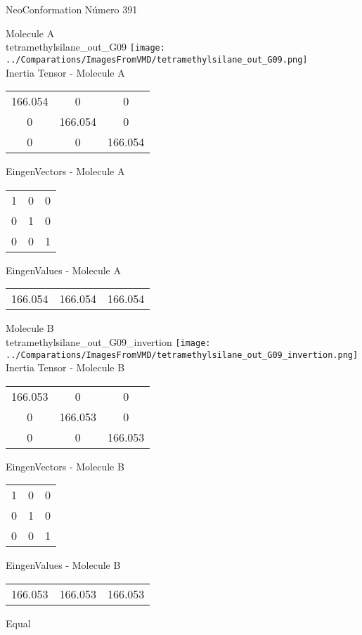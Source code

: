 \vtab[-2cm]
\begin{center}
{\large NeoConformation \tab Número 391}
\end{center}
\begin{multicols}{2}
\begin{center}

Molecule A \\ 
tetramethylsilane\_out\_G09
\texttt{[image: ../Comparations/ImagesFromVMD/tetramethylsilane\_out\_G09.png]}
\\
Inertia Tensor - Molecule A \\
\vtab

\begin{tabular}{|c c c|}
166.054	 & 	0	 & 	0	 \\
0	 & 	166.054	 & 	0	 \\
0	 & 	0	 & 	166.054
\end{tabular}

\vtab
 EingenVectors - Molecule A     \\
\vtab
\begin{tabular}{|c c c|}
1	 & 	0	 & 	0	 \\
0	 & 	1	 & 	0	 \\
0	 & 	0	 & 	1
\end{tabular}

\vtab
 EingenValues - Molecule A     \\
\vtab
\begin{tabular}{|c c c|}
166.054	 & 	166.054	 & 	166.054	 \\
\end{tabular}
\columnbreak

Molecule B \\ 
tetramethylsilane\_out\_G09\_invertion
\texttt{[image: ../Comparations/ImagesFromVMD/tetramethylsilane\_out\_G09\_invertion.png]}
\\
Inertia Tensor - Molecule B \\
\vtab

\begin{tabular}{|c c c|}
166.053	 & 	0	 & 	0	 \\
0	 & 	166.053	 & 	0	 \\
0	 & 	0	 & 	166.053
\end{tabular}

\vtab
 EingenVectors - Molecule B     \\
\vtab
\begin{tabular}{|c c c|}
1	 & 	0	 & 	0	 \\
0	 & 	1	 & 	0	 \\
0	 & 	0	 & 	1
\end{tabular}

\vtab
 EingenValues - Molecule B     \\
\vtab
\begin{tabular}{|c c c|}
166.053	 & 	166.053	 & 	166.053	 \\
\end{tabular}

\end{center}
\end{multicols}
\begin{center}
\vtab
\vtab
\textcolor{NavyBlue}{\Large Equal}
\end{center}


